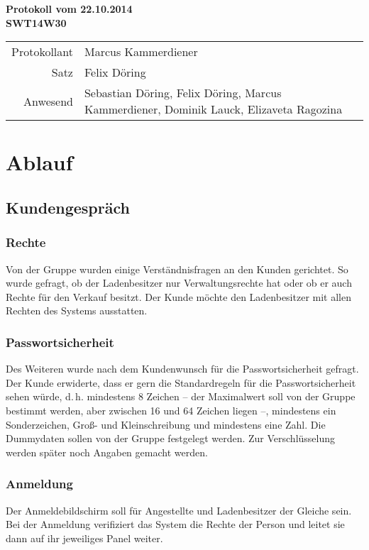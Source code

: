 \documentclass{scrartcl}
\begin{document}
\begin{center}
\LARGE \bf{Protokoll vom 22.10.2014 \\
SWT14W30}
\end{center}

\begin{tabular}{rp{10cm}}
Protokollant & Marcus Kammerdiener \\
Satz & Felix Döring \\
Anwesend & Sebastian Döring, Felix Döring, Marcus Kammerdiener, Dominik Lauck, Elizaveta Ragozina \\
\end{tabular}

\vspace*{3em}

\section{Ablauf}
\subsection{Kundengespr\"ach}
\subsubsection{Rechte}
Von der Gruppe wurden einige Verständnisfragen an den Kunden gerichtet. So wurde gefragt, ob der Ladenbesitzer nur Verwaltungsrechte hat oder ob er auch Rechte für den Verkauf besitzt. Der Kunde möchte den Ladenbesitzer mit allen Rechten des Systems ausstatten.
\subsubsection{Passwortsicherheit}
Des Weiteren wurde nach dem Kundenwunsch für die Passwortsicherheit gefragt. Der Kunde erwiderte, dass er gern die Standardregeln für die Passwortsicherheit sehen würde, d.\,h. mindestens 8 Zeichen -- der Maximalwert soll von der Gruppe bestimmt werden, aber zwischen 16 und 64 Zeichen liegen --, mindestens ein Sonderzeichen, Groß- und Kleinschreibung und mindestens eine Zahl. Die Dummydaten sollen von der Gruppe festgelegt werden. Zur Verschlüsselung werden später noch Angaben gemacht werden.
\subsubsection{Anmeldung}
Der Anmeldebildschirm soll für Angestellte und Ladenbesitzer der Gleiche sein. Bei der Anmeldung verifiziert das System die Rechte der Person und leitet sie dann auf ihr jeweiliges Panel weiter.
\end{document}
